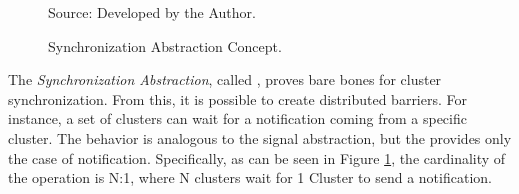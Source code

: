 				\begin{figure}[t]
					\centering
					\caption{Synchronization Abstraction Concept.}



					Source: Developed by the Author.
					\label{fig.conpt_sync}
				\end{figure}

				The \textit{Synchronization Abstraction}, called \sync, proves bare bones
				for cluster synchronization.
				From this, it is possible to create distributed barriers.
				For instance, a set of clusters can wait for a notification coming
				from a specific cluster.
				The behavior is analogous to the \posix signal abstraction, but the \sync
				provides only the case of notification.
				Specifically, as can be seen in Figure \ref{fig.conpt_sync}, the
				cardinality of the operation is N:1, where N clusters wait for 1 Cluster
				to send a notification.

			\label{sec.mailbox-abs}

